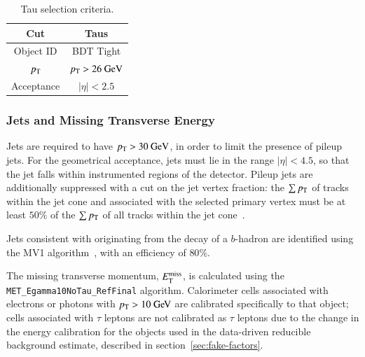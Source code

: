 \begin{table}[h]
	\centering
		\begin{tabular}{cc}
			Cut & Taus \\
			\hline
			Object ID & BDT Tight \\
			$p_{\text{T}}$ & $p_{\text{T}}>26~\mbox{GeV}$ \\
			Acceptance & $|\eta|<2.5$ \\
		\end{tabular}
	\caption{Tau selection criteria.}
	\label{table:tau-selections}
\end{table}

\subsubsection{Jets and Missing Transverse Energy}\label{sec:model-independent-jets-met}


Jets are required to have $p_{\text{T}}>30~\mbox{GeV}$, in order to limit the presence of pileup jets. For the geometrical acceptance, jets must lie in the range $|\eta|<4.5$, so that the jet falls within instrumented regions of the detector. Pileup jets are additionally suppressed with a cut on the jet vertex fraction: the $\sum p_{\text{T}}$ of tracks within the jet cone and associated with the selected primary vertex must be at least $50\%$ of the $\sum p_{\text{T}}$ of all tracks within the jet cone~\cite{TheATLASCollaboration:2013vb}. 

Jets consistent with originating from the decay of a $b$-hadron are identified using the MV1 algorithm~\cite{TheATLASCollaboration:2014vj}, with an efficiency of $80\%$. 

The missing transverse momentum, $E_{\text{T}}^{\text{miss}}$, is calculated using the \texttt{MET\_Egamma10NoTau\_RefFinal} algorithm. Calorimeter cells associated with electrons or photons with $\pt>10 \GeV$ are calibrated specifically to that object; cells associated with $\tau$ leptons are not calibrated as $\tau$ leptons due to the change in the energy calibration for the objects used in the data-driven reducible background estimate, described in section~\ref{sec:fake-factors}. 




